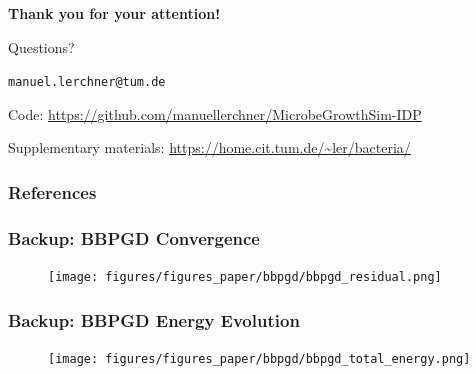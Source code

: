 \documentclass[10pt,t]{beamer}
\begin{document}
\begin{frame}
    \begin{center}
        \vspace{1cm}
        {\LARGE \textbf{Thank you for your attention!}}

        \vspace{1.5cm}

        \Huge{Questions?}

        \vspace{1.5cm}

        \normalsize
        \texttt{manuel.lerchner@tum.de}

        \vspace{0.3cm}

        \small
        Code: \url{https://github.com/manuellerchner/MicrobeGrowthSim-IDP}

        \vspace{0.2cm}

        Supplementary materials: \url{https://home.cit.tum.de/~ler/bacteria/}
    \end{center}
\end{frame}

\begin{frame}
    \frametitle{References}
    \footnotesize
    
    
\end{frame}


\appendix

\begin{frame}
    \frametitle{Backup: BBPGD Convergence}

    \begin{figure}
        \centering
        \texttt{[image: figures/figures\_paper/bbpgd/bbpgd\_residual.png]}
    \end{figure}

\end{frame}

\begin{frame}
    \frametitle{Backup: BBPGD Energy Evolution}

    \begin{figure}
        \centering
        \texttt{[image: figures/figures\_paper/bbpgd/bbpgd\_total\_energy.png]}
    \end{figure}

\end{frame}
\end{document}
